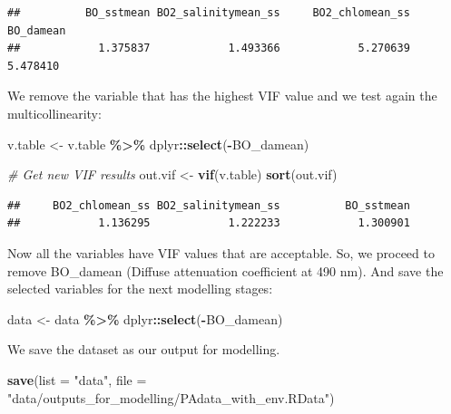 \documentclass[
]{book}
\newenvironment{Shaded}{\begin{snugshade}}{\end{snugshade}}
\newcommand{\AttributeTok}[1]{\textcolor[rgb]{0.13,0.29,0.53}{#1}}
\newcommand{\CommentTok}[1]{\textcolor[rgb]{0.56,0.35,0.01}{\textit{#1}}}
\newcommand{\FunctionTok}[1]{\textcolor[rgb]{0.13,0.29,0.53}{\textbf{#1}}}
\newcommand{\NormalTok}[1]{#1}
\newcommand{\OtherTok}[1]{\textcolor[rgb]{0.56,0.35,0.01}{#1}}
\newcommand{\SpecialCharTok}[1]{\textcolor[rgb]{0.81,0.36,0.00}{\textbf{#1}}}
\newcommand{\StringTok}[1]{\textcolor[rgb]{0.31,0.60,0.02}{#1}}
\begin{document}
\begin{verbatim}
##          BO_sstmean BO2_salinitymean_ss     BO2_chlomean_ss           BO_damean 
##            1.375837            1.493366            5.270639            5.478410
\end{verbatim}

We remove the variable that has the highest VIF value and we test again the multicollinearity:

\begin{Shaded}
\begin{Highlighting}[]
\NormalTok{v.table }\OtherTok{\textless{}{-}}\NormalTok{ v.table }\SpecialCharTok{\%\textgreater{}\%}
\NormalTok{    dplyr}\SpecialCharTok{::}\FunctionTok{select}\NormalTok{(}\SpecialCharTok{{-}}\NormalTok{BO\_damean)}

\CommentTok{\# Get new VIF results}
\NormalTok{out.vif }\OtherTok{\textless{}{-}} \FunctionTok{vif}\NormalTok{(v.table)}
\FunctionTok{sort}\NormalTok{(out.vif)}
\end{Highlighting}
\end{Shaded}

\begin{verbatim}
##     BO2_chlomean_ss BO2_salinitymean_ss          BO_sstmean 
##            1.136295            1.222233            1.300901
\end{verbatim}

Now all the variables have VIF values that are acceptable. So, we proceed to remove BO\_damean (Diffuse attenuation coefficient at 490 nm). And save the selected variables for the next modelling stages:

\begin{Shaded}
\begin{Highlighting}[]
\NormalTok{data }\OtherTok{\textless{}{-}}\NormalTok{ data }\SpecialCharTok{\%\textgreater{}\%}
\NormalTok{    dplyr}\SpecialCharTok{::}\FunctionTok{select}\NormalTok{(}\SpecialCharTok{{-}}\NormalTok{BO\_damean)}
\end{Highlighting}
\end{Shaded}

We save the dataset as our output for modelling.

\begin{Shaded}
\begin{Highlighting}[]
\FunctionTok{save}\NormalTok{(}\AttributeTok{list =} \StringTok{"data"}\NormalTok{, }\AttributeTok{file =} \StringTok{"data/outputs\_for\_modelling/PAdata\_with\_env.RData"}\NormalTok{)}
\end{Highlighting}
\end{Shaded}
\end{document}
